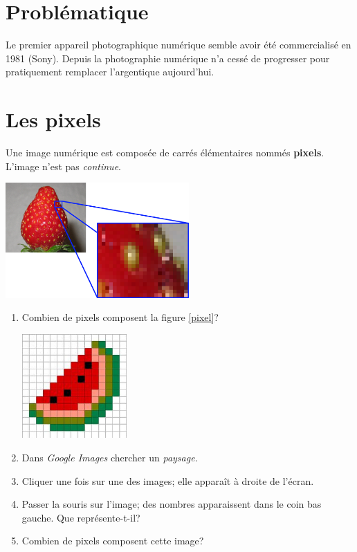 \documentclass[a4paper,11pt]{article}
\begin{document}
\begin{Form}
\section{Problématique}
Le premier appareil photographique numérique semble avoir été commercialisé en 1981 (Sony). Depuis la photographie numérique n'a cessé de progresser pour pratiquement remplacer l'argentique aujourd'hui.
\begin{center}
\end{center}
\section{Les pixels}
Une image numérique est composée de carrés élémentaires nommés \textbf{pixels}. L'image n'est pas \emph{continue}.
\begin{center}
\centering
\includegraphics[width=7cm]{ressources/fraise.png}
\label{fraise}
\end{center}

\begin{activite}
\begin{enumerate}
\item Combien de pixels composent la figure \ref{pixel}?
\begin{center}
\centering
\includegraphics[width=4cm]{ressources/pasteque.jpg}
\label{pixel}
\end{center}
\item Dans \emph{Google Images} chercher un \emph{paysage}.
\item Cliquer une fois sur une des images; elle apparaît à droite de l'écran.
\item Passer la souris sur l'image; des nombres apparaissent dans le coin bas gauche. Que représente-t-il?
\item Combien de pixels composent cette image?
\end{enumerate}
\end{activite}


\end{Form}
\end{document}
